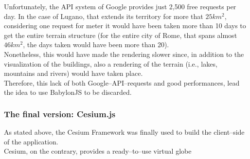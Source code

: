 Unfortunately, the API system of Google provides just 2,500 free requests per day. In the case of Lugano, that extends its territory for more that $25km^2$, considering one request for meter it would have been taken more than 10 days to get the entire terrain structure (for the entire city of Rome, that spans almost $46km^2$, the days taken would have been more than 20).\\

Nonetheless, this would have made the rendering slower since, in addition to the visualization of the buildings, also a rendering of the terrain (i.e., lakes, mountains and rivers) would have taken place.\\
Therefore, this lack of both Google--API--requests and good performances, lead the idea to use BabylonJS to be discarded.
\subsubsection{The final version: Cesium.js}
As stated above, the Cesium Framework was finally used to build the client--side of the application.\\
Cesium, on the contrary, provides a ready--to--use virtual globe
\begin{center}
\end{center}

